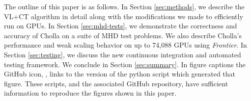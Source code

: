 The outline of this paper is as follows. In Section \ref{sec:methods}, we describe the VL+CT algorithm in detail along with the modifications we made to efficiently run on GPUs. In Section \ref{sec:mhd-tests}, we demonstrate the correctness and accuracy of Cholla on a suite of MHD test problems. We also describe Cholla's performance and weak scaling behavior on up to 74,088 GPUs using \textit{Frontier}. In Section \ref{sec:testing}, we discuss the new continuous integration and automated testing framework. We conclude in Section \ref{sec:summary}. In figure captions the GitHub icon, , links to the version of the python script which generated that figure. These scripts, and the associated GitHub repository, have sufficient information to reproduce the figures shown in this paper.
